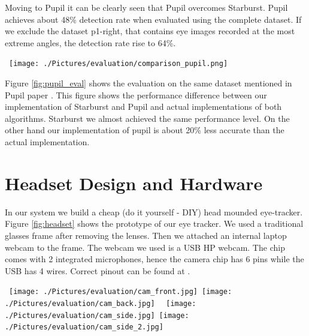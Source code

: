 Moving to Pupil it can be clearly seen that Pupil overcomes Starburst. Pupil achieves about 48\% detection rate when evaluated using the complete dataset. If we exclude the dataset p1-right, that contains eye images recorded at the most extreme angles, the detection rate rise to 64\%. \bigskip

\begin{figure*}[!h]
\begin{dBox}
\centering
	\mbox{
		\texttt{[image: ./Pictures/evaluation/comparison\_pupil.png]}
	}
   \caption{Comparison of pupil detection rate for Pupil’s algorithm, the stock algorithm proposed by Swirski et al., the ITU gaze tracker and Starburst. Figure from Pupil \cite{starburst} \label{fig:pupil_eval} }   
\end{dBox}   
\end{figure*}

Figure \ref{fig:pupil_eval} shows the evaluation on the same dataset mentioned in Pupil paper \cite{pupil} . This figure shows the performance difference between our implementation of Starburst and Pupil and actual implementations of both algorithms. Starburst we almost achieved the same performance level. On the other hand our implementation of pupil is about 20\% less accurate than the actual implementation.




\section{Headset Design and Hardware} 
In our system we build a cheap (do it yourself - DIY) head mounded eye-tracker. Figure \ref{fig:headset} shows the prototype of our eye tracker. We used a traditional glasses frame after removing the lenses. Then we attached an internal laptop webcam to the frame. The webcam we used is a USB HP webcam. The chip comes with 2 integrated microphones, hence the camera chip has 6 pins while the USB has 4 wires. Correct pinout can be found at \cite{myblogpost}.



\begin{figure*}[!h]
\begin{dBox}
\centering
	\mbox{
		\texttt{[image: ./Pictures/evaluation/cam\_front.jpg]}
		\texttt{[image: ./Pictures/evaluation/cam\_back.jpg]}
	}
	\mbox{
		\texttt{[image: ./Pictures/evaluation/cam\_side.jpg]}
		\texttt{[image: ./Pictures/evaluation/cam\_side\_2.jpg]}
	}
   \caption{Prototype of our cheap eye-tracking head set\label{fig:headset} }   
\end{dBox}   
\end{figure*}

